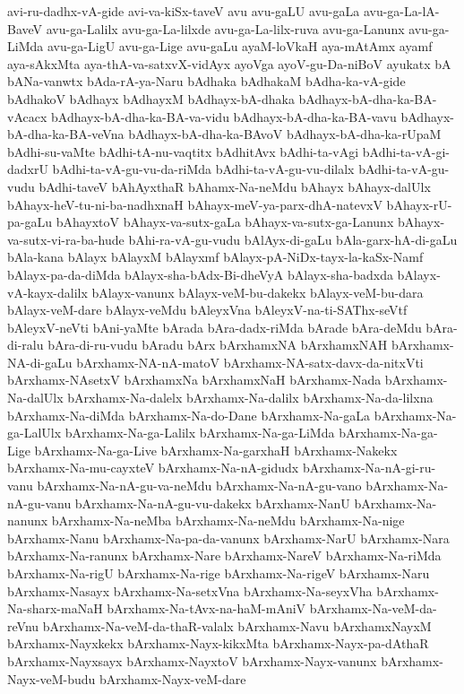 {avi-ru-dadhx-vA-gide
avi-va-kiSx-taveV
avu
avu-gaLU
avu-gaLa
avu-ga-La-lA-BaveV
avu-ga-Lalilx
avu-ga-La-lilxde
avu-ga-La-lilx-ruva
avu-ga-Lanunx
avu-ga-LiMda
avu-ga-LigU
avu-ga-Lige
avu-gaLu
ayaM-loVkaH
aya-mAtAmx
ayamf
aya-sAkxMta
aya-thA-va-satxvX-vidAyx
ayoVga
ayoV-gu-Da-niBoV
ayukatx
bA
bANa-vanwtx
bAda-rA-ya-Naru
bAdhaka
bAdhakaM
bAdha-ka-vA-gide
bAdhakoV
bAdhayx
bAdhayxM
bAdhayx-bA-dhaka
bAdhayx-bA-dha-ka-BA-vAcacx
bAdhayx-bA-dha-ka-BA-va-vidu
bAdhayx-bA-dha-ka-BA-vavu
bAdhayx-bA-dha-ka-BA-veVna
bAdhayx-bA-dha-ka-BAvoV
bAdhayx-bA-dha-ka-rUpaM
bAdhi-su-vaMte
bAdhi-tA-nu-vaqtitx
bAdhitAvx
bAdhi-ta-vAgi
bAdhi-ta-vA-gi-dadxrU
bAdhi-ta-vA-gu-vu-da-riMda
bAdhi-ta-vA-gu-vu-dilalx
bAdhi-ta-vA-gu-vudu
bAdhi-taveV
bAhAyxthaR
bAhamx-Na-neMdu
bAhayx
bAhayx-dalUlx
bAhayx-heV-tu-ni-ba-nadhxnaH
bAhayx-meV-ya-parx-dhA-natevxV
bAhayx-rU-pa-gaLu
bAhayxtoV
bAhayx-va-sutx-gaLa
bAhayx-va-sutx-ga-Lanunx
bAhayx-va-sutx-vi-ra-ba-hude
bAhi-ra-vA-gu-vudu
bAlAyx-di-gaLu
bAla-garx-hA-di-gaLu
bAla-kana
bAlayx
bAlayxM
bAlayxmf
bAlayx-pA-NiDx-tayx-la-kaSx-Namf
bAlayx-pa-da-diMda
bAlayx-sha-bAdx-Bi-dheVyA
bAlayx-sha-badxda
bAlayx-vA-kayx-dalilx
bAlayx-vanunx
bAlayx-veM-bu-dakekx
bAlayx-veM-bu-dara
bAlayx-veM-dare
bAlayx-veMdu
bAleyxVna
bAleyxV-na-ti-SAThx-seVtf
bAleyxV-neVti
bAni-yaMte
bArada
bAra-dadx-riMda
bArade
bAra-deMdu
bAra-di-ralu
bAra-di-ru-vudu
bAradu
bArx
bArxhamxNA
bArxhamxNAH
bArxhamx-NA-di-gaLu
bArxhamx-NA-nA-matoV
bArxhamx-NA-satx-davx-da-nitxVti
bArxhamx-NAsetxV
bArxhamxNa
bArxhamxNaH
bArxhamx-Nada
bArxhamx-Na-dalUlx
bArxhamx-Na-dalelx
bArxhamx-Na-dalilx
bArxhamx-Na-da-lilxna
bArxhamx-Na-diMda
bArxhamx-Na-do-Dane
bArxhamx-Na-gaLa
bArxhamx-Na-ga-LalUlx
bArxhamx-Na-ga-Lalilx
bArxhamx-Na-ga-LiMda
bArxhamx-Na-ga-Lige
bArxhamx-Na-ga-Live
bArxhamx-Na-garxhaH
bArxhamx-Nakekx
bArxhamx-Na-mu-cayxteV
bArxhamx-Na-nA-gidudx
bArxhamx-Na-nA-gi-ru-vanu
bArxhamx-Na-nA-gu-va-neMdu
bArxhamx-Na-nA-gu-vano
bArxhamx-Na-nA-gu-vanu
bArxhamx-Na-nA-gu-vu-dakekx
bArxhamx-NanU
bArxhamx-Na-nanunx
bArxhamx-Na-neMba
bArxhamx-Na-neMdu
bArxhamx-Na-nige
bArxhamx-Nanu
bArxhamx-Na-pa-da-vanunx
bArxhamx-NarU
bArxhamx-Nara
bArxhamx-Na-ranunx
bArxhamx-Nare
bArxhamx-NareV
bArxhamx-Na-riMda
bArxhamx-Na-rigU
bArxhamx-Na-rige
bArxhamx-Na-rigeV
bArxhamx-Naru
bArxhamx-Nasayx
bArxhamx-Na-setxVna
bArxhamx-Na-seyxVha
bArxhamx-Na-sharx-maNaH
bArxhamx-Na-tAvx-na-haM-mAniV
bArxhamx-Na-veM-da-reVnu
bArxhamx-Na-veM-da-thaR-valalx
bArxhamx-Navu
bArxhamxNayxM
bArxhamx-Nayxkekx
bArxhamx-Nayx-kikxMta
bArxhamx-Nayx-pa-dAthaR
bArxhamx-Nayxsayx
bArxhamx-NayxtoV
bArxhamx-Nayx-vanunx
bArxhamx-Nayx-veM-budu
bArxhamx-Nayx-veM-dare
}
